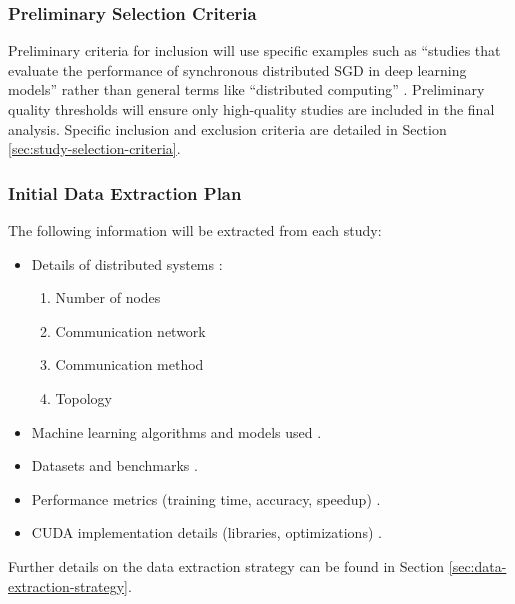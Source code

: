 \subsubsection{Preliminary Selection Criteria}
Preliminary criteria for inclusion will use specific examples such as ``studies that evaluate the
performance of synchronous distributed SGD in deep learning models'' rather than general terms like
``distributed computing'' \cite{ben-nun_demystifying_2020}. Preliminary quality thresholds will
ensure only high-quality studies are included in the final analysis. Specific inclusion and
exclusion criteria are detailed in Section \ref{sec:study-selection-criteria}.

\subsubsection{Initial Data Extraction Plan}
The following information will be extracted from each study:
\begin{itemize}
	\item Details of distributed systems \cite{ben-nun_demystifying_2020,langer_distributed_2020}:
	      \begin{enumerate}
		      \item Number of nodes
		      \item Communication network
		      \item Communication method
		      \item Topology
	      \end{enumerate}
	\item Machine learning algorithms and models used \cite{xing_strategies_2015}.
	\item Datasets and benchmarks \cite{ben-nun_demystifying_2020}.
	\item Performance metrics (training time, accuracy, speedup)
	      \cite{ben-nun_demystifying_2020,langer_distributed_2020,xing_strategies_2015}.
	\item CUDA implementation details (libraries, optimizations)
	      \cite{verbraeken_survey_2021,ben-nun_demystifying_2020,xing_strategies_2015}.
\end{itemize}
Further details on the data extraction strategy can be found in Section \ref{sec:data-extraction-strategy}.


